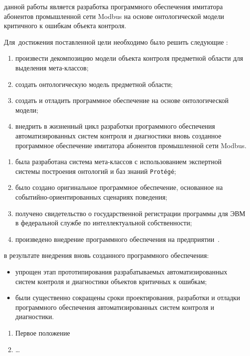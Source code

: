 {\aim} данной работы является разработка программного обеспечения 
  имитатора абонентов промышленной сети Modbus на основе онтологической модели критичного к ошибкам объекта контроля.

Для~достижения поставленной цели необходимо было решить следующие {\tasks}:
\begin{enumerate}
  \item произвести декомпозицию модели объекта контроля предметной области для выделения мета-классов;
  \item создать онтологическую модель предметной области;
  \item создать и отладить программное обеспечение на основе онтологической модели;
  \item внедрить в жизненный цикл разработки программного обеспечения автоматизированных систем контроля и диагностики
        вновь созданное программное обеспечение имитатора абонентов промышленной сети Modbus.
\end{enumerate}


{\novelty}
\begin{enumerate}
  \item была разработана система мета-классов с использованием экспертной системы построения онтологий и баз знаний \texttt{Protégé};
  \item было создано оригинальное программное обеспечение, основанное на событийно-ориентированных сценариях поведения;
  \item получено свидетельство о государственной регистрации программы для ЭВМ в федеральной службе по интеллектуальной собственности;
  \item произведено внедрение программного обеспечения на предприятии~\leadingOrganizationTitle.
\end{enumerate}

{\influence} в результате внедрения вновь созданного программного обеспечения:
\begin{itemize}
  \item упрощен этап прототипирования разрабатываемых автоматизированных систем контроля и диагностики объектов критичных к ошибкам;
  \item были существенно сокращены сроки проектирования, разработки и отладки программного обеспечения автоматизированных систем контроля и диагностики.
\end{itemize}

\todo{{\methods} \ldots}

\begin{enumerate}
  \item Первое положение
  \item \ldots
\end{enumerate}

